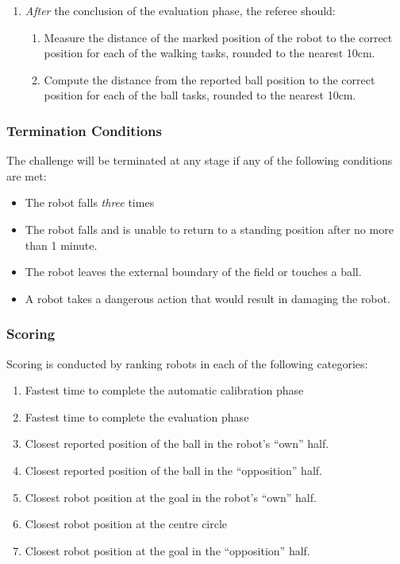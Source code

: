 \begin{enumerate}
    \item \textit{After} the conclusion of the evaluation phase, the referee should:
    \begin{enumerate}
        \item Measure the distance of the marked position of the robot to the correct position for each of the walking tasks, rounded to the nearest 10cm.
        \item Compute the distance from the reported ball position to the correct position for each of the ball tasks, rounded to the nearest 10cm.
    \end{enumerate}  
\end{enumerate} 

\subsubsection{Termination Conditions}

The challenge will be terminated at any stage if any of the following conditions are met:
\begin{itemize}
    \item The robot falls \textit{three} times
    \item The robot falls and is unable to return to a standing position after no more than 1 minute.
    \item The robot leaves the external boundary of the field or touches a ball.
    \item A robot takes a dangerous action that would result in damaging the robot. %
\end{itemize}

\subsubsection{Scoring}

Scoring is conducted by ranking robots in each of the following categories:
\begin{enumerate}
    \item Fastest time to complete the automatic calibration phase
    \item Fastest time to complete the evaluation phase
    \item Closest reported position of the ball in the robot's ``own'' half.
    \item Closest reported position of the ball in the ``opposition'' half.
    \item Closest robot position at the goal in the robot's ``own'' half.
    \item Closest robot position at the centre circle
    \item Closest robot position at the goal in the ``opposition'' half.
\end{enumerate} 


